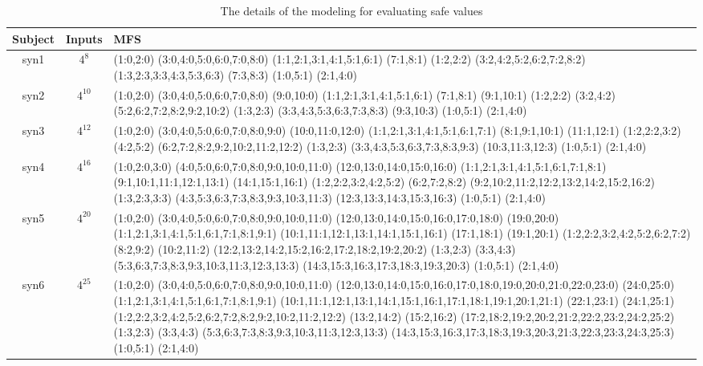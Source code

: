 \documentclass[10pt,journal,compsoc]{IEEEtran}
\begin{document}
\begin{table*}[htbp]
\center
\caption{The details of the modeling for evaluating safe values}
\label{detail-eva-safe}

\begin{tabular}{|c|c|m{}|}
\hline
Subject & Inputs & MFS  \\\hline
syn1 & $4^{8}$ & (1:0,2:0) (3:0,4:0,5:0,6:0,7:0,8:0) (1:1,2:1,3:1,4:1,5:1,6:1) (7:1,8:1) (1:2,2:2) (3:2,4:2,5:2,6:2,7:2,8:2) (1:3,2:3,3:3,4:3,5:3,6:3) (7:3,8:3) (1:0,5:1) (2:1,4:0)  \\ \hline
syn2 & $4^{10}$ & (1:0,2:0) (3:0,4:0,5:0,6:0,7:0,8:0) (9:0,10:0) (1:1,2:1,3:1,4:1,5:1,6:1) (7:1,8:1) (9:1,10:1) (1:2,2:2) (3:2,4:2) (5:2,6:2,7:2,8:2,9:2,10:2) (1:3,2:3) (3:3,4:3,5:3,6:3,7:3,8:3) (9:3,10:3) (1:0,5:1) (2:1,4:0)  \\ \hline
syn3 & $4^{12}$ & (1:0,2:0) (3:0,4:0,5:0,6:0,7:0,8:0,9:0) (10:0,11:0,12:0) (1:1,2:1,3:1,4:1,5:1,6:1,7:1) (8:1,9:1,10:1) (11:1,12:1) (1:2,2:2,3:2) (4:2,5:2) (6:2,7:2,8:2,9:2,10:2,11:2,12:2) (1:3,2:3) (3:3,4:3,5:3,6:3,7:3,8:3,9:3) (10:3,11:3,12:3) (1:0,5:1) (2:1,4:0)  \\ \hline
syn4 & $4^{16}$ & (1:0,2:0,3:0) (4:0,5:0,6:0,7:0,8:0,9:0,10:0,11:0) (12:0,13:0,14:0,15:0,16:0) (1:1,2:1,3:1,4:1,5:1,6:1,7:1,8:1) (9:1,10:1,11:1,12:1,13:1) (14:1,15:1,16:1) (1:2,2:2,3:2,4:2,5:2) (6:2,7:2,8:2) (9:2,10:2,11:2,12:2,13:2,14:2,15:2,16:2) (1:3,2:3,3:3) (4:3,5:3,6:3,7:3,8:3,9:3,10:3,11:3) (12:3,13:3,14:3,15:3,16:3) (1:0,5:1) (2:1,4:0)  \\ \hline
syn5 & $4^{20}$ & (1:0,2:0) (3:0,4:0,5:0,6:0,7:0,8:0,9:0,10:0,11:0) (12:0,13:0,14:0,15:0,16:0,17:0,18:0) (19:0,20:0) (1:1,2:1,3:1,4:1,5:1,6:1,7:1,8:1,9:1) (10:1,11:1,12:1,13:1,14:1,15:1,16:1) (17:1,18:1) (19:1,20:1) (1:2,2:2,3:2,4:2,5:2,6:2,7:2) (8:2,9:2) (10:2,11:2) (12:2,13:2,14:2,15:2,16:2,17:2,18:2,19:2,20:2) (1:3,2:3) (3:3,4:3) (5:3,6:3,7:3,8:3,9:3,10:3,11:3,12:3,13:3) (14:3,15:3,16:3,17:3,18:3,19:3,20:3) (1:0,5:1) (2:1,4:0)  \\ \hline
syn6 & $4^{25}$ & (1:0,2:0) (3:0,4:0,5:0,6:0,7:0,8:0,9:0,10:0,11:0) (12:0,13:0,14:0,15:0,16:0,17:0,18:0,19:0,20:0,21:0,22:0,23:0) (24:0,25:0) (1:1,2:1,3:1,4:1,5:1,6:1,7:1,8:1,9:1) (10:1,11:1,12:1,13:1,14:1,15:1,16:1,17:1,18:1,19:1,20:1,21:1) (22:1,23:1) (24:1,25:1) (1:2,2:2,3:2,4:2,5:2,6:2,7:2,8:2,9:2,10:2,11:2,12:2) (13:2,14:2) (15:2,16:2) (17:2,18:2,19:2,20:2,21:2,22:2,23:2,24:2,25:2) (1:3,2:3) (3:3,4:3) (5:3,6:3,7:3,8:3,9:3,10:3,11:3,12:3,13:3) (14:3,15:3,16:3,17:3,18:3,19:3,20:3,21:3,22:3,23:3,24:3,25:3) (1:0,5:1) (2:1,4:0)  \\ \hline

\end{tabular}
\end{table*}
\end{document}
